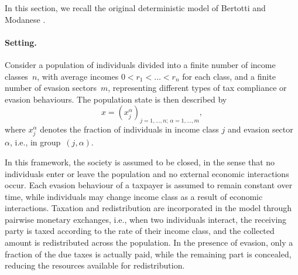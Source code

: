 \documentclass[11pt]{article}
\theoremstyle{plain}
\theoremstyle{definition}
\newcommand{\1}{\mathbf{1}}
\begin{document}
In this section, we recall the original deterministic model of Bertotti and Modanese \cite{bertotti2018mathematical}. 

\paragraph{Setting.}

Consider a population of individuals divided into a finite number of income classes~$n$, with average incomes $0<r_1<\dots<r_n$ for each class, and a finite number of evasion sectors~$m$, representing different types of tax compliance or evasion behaviours. The population state is then described by
\begin{equation*}
    x=(x_j^\alpha)_{j=1,\dots,n;\,\alpha=1,\dots,m},
\end{equation*}
where %
$x_j^\alpha$ denotes the fraction of individuals in income class $j$ and evasion  sector $\alpha$, i.e., in group~$(j,\alpha)$.

In this framework, the society is assumed to be closed, in the sense that no individuals enter or leave the population and no external economic interactions occur. Each evasion behaviour of a taxpayer is assumed to remain constant over time, while individuals may change income class as a result of economic interactions. Taxation and redistribution are incorporated in the model through pairwise monetary exchanges, i.e., when two individuals interact, the receiving party is taxed according to the rate of their income class, and the collected amount is redistributed across the population. In the presence of evasion, only a fraction of the due taxes is actually paid, while the remaining part is concealed, reducing the resources available for redistribution.
\end{document}
